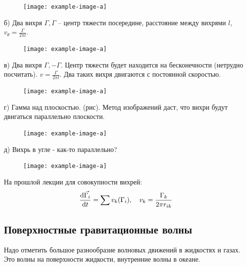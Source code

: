 \begin{figure}[H]
    \centering
    \texttt{[image: example-image-a]}
    \caption{}
    \label{fig:figure1}
\end{figure}

б) Два вихря $\Gamma, \Gamma$ -- центр тяжести посередине, расстояние между вихрями $l$, $v_\theta=\frac{\Gamma}{2\pi l}$.

\begin{figure}[H]
    \centering
    \texttt{[image: example-image-a]}
    \caption{}
    \label{fig:figure1}
\end{figure}

в) Два вихря $\Gamma, -\Gamma$. Центр тяжести будет находится на бесконечности (нетрудно посчитать). $v=\frac{\Gamma}{2\pi l}$. Два таких вихря двигаются с постоянной скоростью.

\begin{figure}[H]
    \centering
    \texttt{[image: example-image-a]}
    \caption{}
    \label{fig:figure1}
\end{figure}

г) Гамма над плоскостью. (рис). Метод изображений даст, что вихри будут двигаться параллельно плоскости.

\begin{figure}[H]
    \centering
    \texttt{[image: example-image-a]}
    \caption{}
    \label{fig:figure1}
\end{figure}

д) Вихрь в угле - как-то параллельно?

\begin{figure}[H]
    \centering
    \texttt{[image: example-image-a]}
    \caption{}
    \label{fig:figure1}
\end{figure}


На прошлой лекции для совокупности вихрей:
\begin{gather}
	\label{eqga}
	\dv{\vec{\Gamma_i}}{t}=\sum v_k(\Gamma_i), \quad v_k=\frac{\Gamma_k}{2\pi r_{ik}}
\end{gather}

\newpage
\subsection{Поверхностные гравитационные волны}

Надо отметить большое разнообразие волновых движений в
жидкостях и газах. Это волны на поверхности жидкости, внутренние
волны в океане. 

